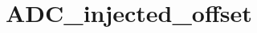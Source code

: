 \hypertarget{group___a_d_c__injected__offset}{\section{A\-D\-C\-\_\-injected\-\_\-offset}
\label{group___a_d_c__injected__offset}
}
